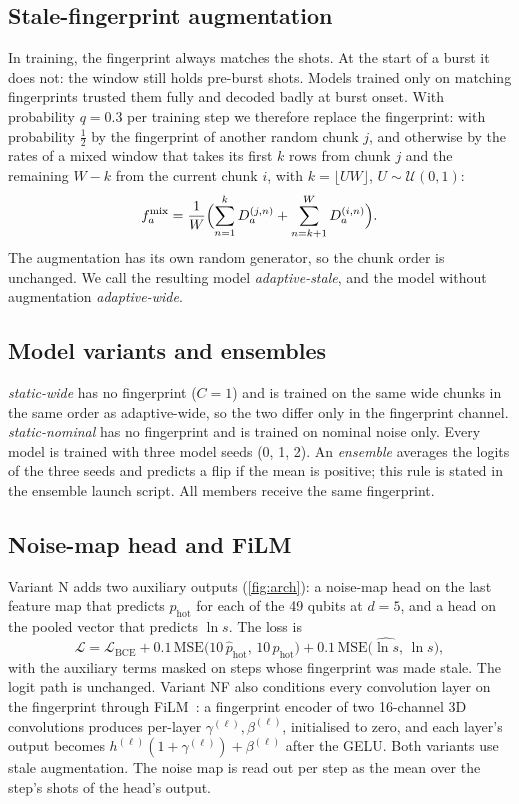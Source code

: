 \documentclass[11pt,a4paper]{article}
\begin{document}
\subsection{Stale-fingerprint augmentation}\label{sec:stale}
In training, the fingerprint always matches the shots. At the start of a burst it does not: the window still holds
pre-burst shots. Models trained only on matching fingerprints trusted them fully and decoded badly at burst onset.
With probability $q=0.3$ per training step we therefore replace the fingerprint: with probability $\tfrac12$ by the
fingerprint of another random chunk $j$, and otherwise by the rates of a mixed window that takes its first $k$ rows
from chunk $j$ and the remaining $W-k$ from the current chunk $i$, with $k=\lfloor UW\rfloor$, $U\sim\mathcal U(0,1)$:
\begin{equation}
  f^{\mathrm{mix}}_a=\frac1W\Bigl(\sum_{n=1}^{k}D^{(j,n)}_a+\sum_{n=k+1}^{W}D^{(i,n)}_a\Bigr).
\end{equation}
The augmentation has its own random generator, so the chunk order is unchanged. We call the resulting model
\emph{adaptive-stale}, and the model without augmentation \emph{adaptive-wide}.

\subsection{Model variants and ensembles}\label{sec:variants}
\emph{static-wide} has no fingerprint ($C=1$) and is trained on the same wide chunks in the same order as
adaptive-wide, so the two differ only in the fingerprint channel. \emph{static-nominal} has no fingerprint and is
trained on nominal noise only. Every model is trained with three model seeds (0, 1, 2). An \emph{ensemble} averages
the logits of the three seeds and predicts a flip if the mean is positive; this rule is stated in the ensemble
launch script. All members receive the same fingerprint.

\subsection{Noise-map head and FiLM}\label{sec:noisehead}
Variant N adds two auxiliary outputs (\cref{fig:arch}): a noise-map head on the last feature map that predicts
$p_{\mathrm{hot}}$ for each of the 49 qubits at $d=5$, and a head on the pooled vector that predicts $\ln s$. The loss is
\begin{equation}
  \mathcal L=\mathcal L_{\mathrm{BCE}}+0.1\,\mathrm{MSE}\bigl(10\,\hat p_{\mathrm{hot}},\,10\,p_{\mathrm{hot}}\bigr)
  +0.1\,\mathrm{MSE}\bigl(\widehat{\ln s},\,\ln s\bigr),
\end{equation}
with the auxiliary terms masked on steps whose fingerprint was made stale. The logit path is unchanged. Variant NF
also conditions every convolution layer on the fingerprint through FiLM~\cite{perez2018film}: a fingerprint
encoder of two 16-channel 3D convolutions produces per-layer $\gamma^{(\ell)},\beta^{(\ell)}$, initialised to zero,
and each layer's output becomes $h^{(\ell)}(1+\gamma^{(\ell)})+\beta^{(\ell)}$ after the GELU. Both variants use
stale augmentation. The noise map is read out per step as the mean over the step's shots of the head's output.
\end{document}
